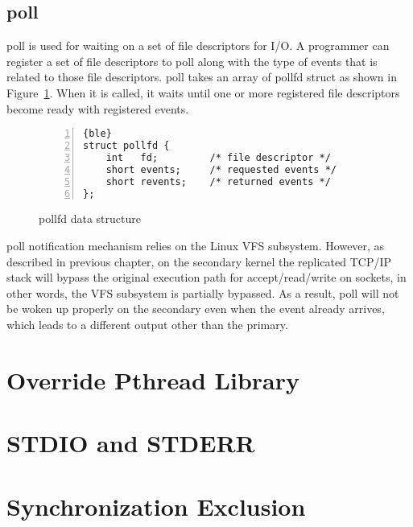 \subsection{poll}

poll is used for waiting on a set of file descriptors for I/O. A programmer can register a set of file descriptors to poll along with the type of events that is related to those file descriptors. poll takes an array of pollfd struct as shown in Figure~\ref{f:pollfd}. When it is called, it waits until one or more registered file descriptors become ready with registered events.

\begin{figure}
\begin{lstlisting}[numbers=left, frame=single, basicstyle=\small, breaklines]{ble}
struct pollfd {
    int   fd;         /* file descriptor */
    short events;     /* requested events */
    short revents;    /* returned events */
};
\end{lstlisting}
\caption{pollfd data structure}
\label{f:pollfd}
\end{figure}

poll notification mechanism relies on the Linux VFS subsystem. However, as described in previous chapter, on the secondary kernel the replicated TCP/IP stack will bypass the original execution path for accept/read/write on sockets, in other words, the VFS subsystem is partially bypassed. As a result, poll will not be woken up properly on the secondary even when the event already arrives, which leads to a different output other than the primary.

\section{Override Pthread Library}

\section{STDIO and STDERR}

\section{Synchronization Exclusion}
